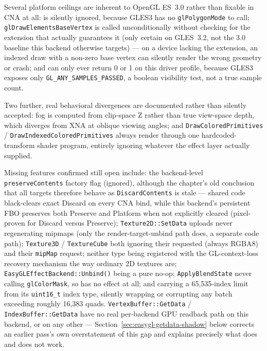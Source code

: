 Several platform ceilings are inherent to OpenGL ES~3.0 rather than fixable in CNA at all:
 is silently ignored, because GLES3 has no
\texttt{glPolygonMode} to call; \texttt{glDrawElementsBaseVertex} is called unconditionally
without checking for the extension that actually guarantees it (only certain on GLES~3.2,
not the 3.0 baseline this backend otherwise targets) --- on a device lacking the extension,
an indexed draw with a non-zero base vertex can silently render the wrong geometry or crash;
and  can only ever return 0 or 1 on this driver
profile, because GLES3 exposes only \texttt{GL\_ANY\_SAMPLES\_PASSED}, a boolean visibility
test, not a true sample count.

Two further, real behavioral divergences are documented rather than silently accepted: fog
is computed from clip-space Z rather than true view-space depth, which diverges from XNA at
oblique viewing angles; and \texttt{DrawColoredPrimitives} / \texttt{DrawIndexedColoredPrimitives}
always render through one hardcoded-transform shader program, entirely ignoring whatever
 the effect layer actually supplied.

Missing features confirmed still open include: the backend-level
\texttt{preserveContents} factory flag (ignored), although the chapter's old conclusion that
all targets therefore behave as \texttt{DiscardContents} is stale --- shared
 code black-clears exact Discard on every CNA bind, while this
backend's persistent FBO preserves both Preserve and Platform when not explicitly cleared
(pixel-proven for Discard versus Preserve); \texttt{Texture2D::SetData}
uploads never regenerating mipmaps (only the render-target-unbind path does, a separate code
path); \texttt{Texture3D} / \texttt{TextureCube} both ignoring their requested
 (always RGBA8) and their \texttt{mipMap} request; neither type being
registered with the GL-context-loss recovery mechanism the way ordinary 2D textures are;
\texttt{EasyGLEffectBackend::Unbind()} being a pure no-op; \texttt{ApplyBlendState} never
calling \texttt{glColorMask}, so  has no effect at all; and
 carrying a 65{,}535-index limit from its \texttt{uint16\_t} index
type, silently wrapping or corrupting any batch exceeding roughly 16{,}383 quads.
\texttt{VertexBuffer::GetData} / \texttt{IndexBuffer::GetData} have no real per-backend GPU
readback path on this backend, or on any other --- Section~\ref{sec:easygl-getdata-shadow}
below corrects an earlier pass's own overstatement of this gap and explains precisely what
does and does not work.

